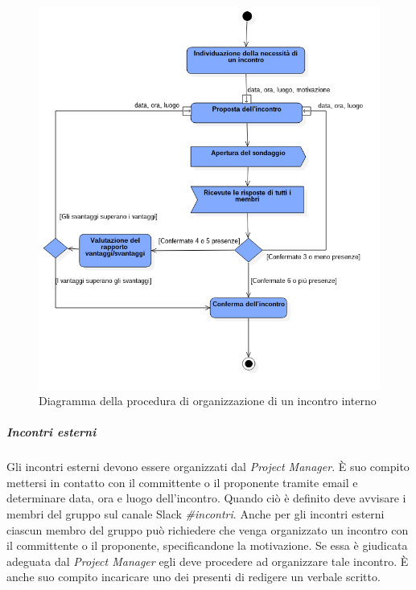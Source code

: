 			\begin{figure}
				\centering
				\includegraphics[width=1\textwidth]{Images/umlincontri.png}
				\caption{Diagramma della procedura di organizzazione di un incontro interno}
			\end{figure}
			
			\subparagraph{Incontri esterni} \Spazio
			 Gli incontri esterni devono essere organizzati dal \emph{Project Manager}. È suo compito mettersi in contatto con il committente o il proponente tramite email e determinare data, ora e luogo dell'incontro. Quando ciò è definito deve avvisare i membri del gruppo sul canale Slack \emph{\#incontri}. Anche per gli incontri esterni ciascun membro del gruppo può richiedere che venga organizzato un incontro con il committente o il proponente, specificandone la motivazione. Se essa è giudicata adeguata dal \emph{Project Manager} egli deve procedere ad organizzare tale incontro. È anche suo compito incaricare uno dei presenti di redigere un verbale scritto.
